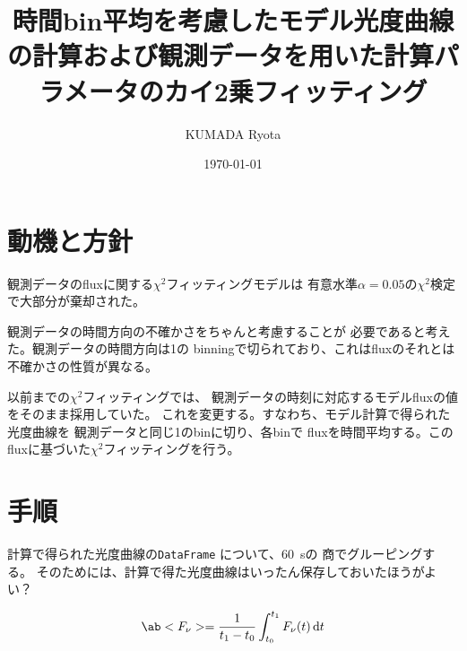 \documentclass{notebook}
\title{時間bin平均を考慮したモデル光度曲線の計算および観測データを用いた計算パラメータのカイ2乗フィッティング}
\author{KUMADA Ryota}
\date{\today}
\begin{document}
\maketitle

\section{動機と方針}
観測データのfluxに関する$\chi^2$フィッティングモデルは
有意水準$\alpha = 0.05$の$\chi^2$検定で大部分が棄却された。

観測データの時間方向の不確かさをちゃんと考慮することが
必要であると考えた。観測データの時間方向は\qty{1}{\min}の
binningで切られており、これはfluxのそれとは不確かさの性質が異なる。

以前までの$\chi^2$フィッティングでは、
観測データの時刻に対応するモデルfluxの値をそのまま採用していた。
これを変更する。すなわち、モデル計算で得られた光度曲線を
観測データと同じ\qty{1}{\min}のbinに切り、各binで
fluxを時間平均する。このfluxに基づいた$\chi^2$フィッティングを行う。


\section{手順}
計算で得られた光度曲線の\lstinline|DataFrame| について、\qty{60}{\s}の
商でグルーピングする。
そのためには、計算で得た光度曲線はいったん保存しておいたほうがよい？

\begin{equation}
  \ab<F_{\nu}> = \frac{1}{t_1 - t_0}\int_{t_0}^{t_1} F_{\nu}(t)\odif{t}
\end{equation}
\end{document}

